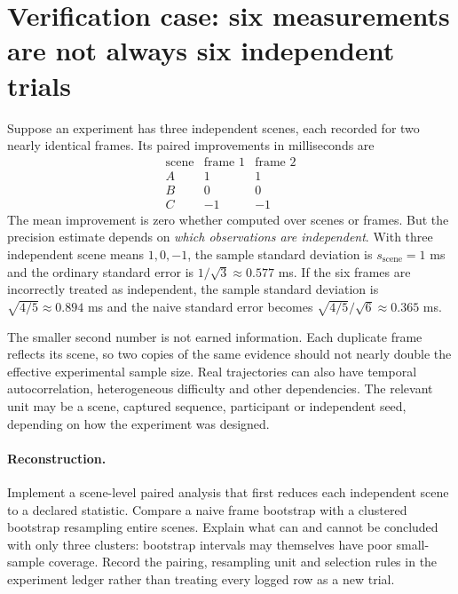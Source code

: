 \clearpage
\section*{Verification case: six measurements are not always six independent trials}
\noindent Suppose an experiment has three independent scenes, each
recorded for two nearly identical frames. Its paired improvements
in milliseconds are
\[
\begin{array}{c|cc}
\text{scene}&\text{frame 1}&\text{frame 2}\\\hline
A&1&1\\B&0&0\\C&-1&-1
\end{array}
\]
The mean improvement is zero whether computed over scenes or frames.
But the precision estimate depends on \emph{which observations are
independent}. With three independent scene means \(1,0,-1\), the
sample standard deviation is \(s_{\mathrm{scene}}=1\) ms and the
ordinary standard error is \(1/\sqrt3\approx0.577\) ms.
If the six frames are incorrectly treated as independent, the
sample standard deviation is \(\sqrt{4/5}\approx0.894\) ms and
the naive standard error becomes
\(\sqrt{4/5}/\sqrt6\approx0.365\) ms.

The smaller second number is not earned information. Each duplicate
frame reflects its scene, so two copies of the same evidence should
not nearly double the effective experimental sample size.
Real trajectories can also have temporal autocorrelation,
heterogeneous difficulty and other dependencies. The relevant
unit may be a scene, captured sequence, participant or independent
seed, depending on how the experiment was designed.

\paragraph{Reconstruction.}
Implement a scene-level paired analysis that first reduces each
independent scene to a declared statistic. Compare a naive frame
bootstrap with a clustered bootstrap resampling entire scenes.
Explain what can and cannot be concluded with only three clusters:
bootstrap intervals may themselves have poor small-sample coverage.
Record the pairing, resampling unit and selection rules in the
experiment ledger rather than treating every logged row as a new trial.
